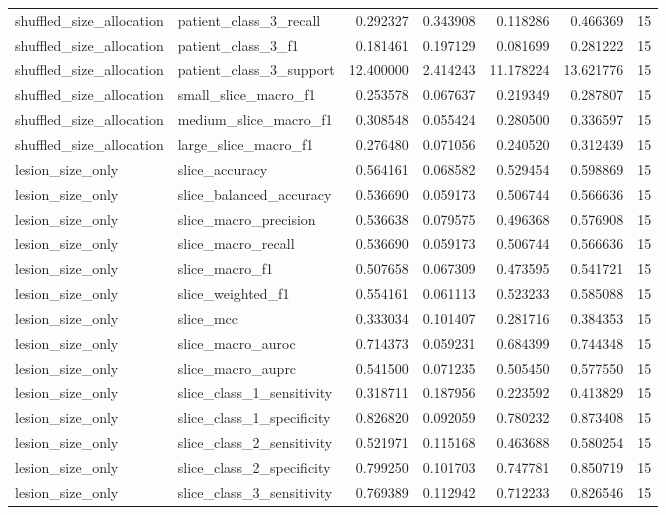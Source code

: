 \begin{tabular}{llrrrrr}
shuffled_size_allocation & patient_class_3_recall & 0.292327 & 0.343908 & 0.118286 & 0.466369 & 15 \\
shuffled_size_allocation & patient_class_3_f1 & 0.181461 & 0.197129 & 0.081699 & 0.281222 & 15 \\
shuffled_size_allocation & patient_class_3_support & 12.400000 & 2.414243 & 11.178224 & 13.621776 & 15 \\
shuffled_size_allocation & small_slice_macro_f1 & 0.253578 & 0.067637 & 0.219349 & 0.287807 & 15 \\
shuffled_size_allocation & medium_slice_macro_f1 & 0.308548 & 0.055424 & 0.280500 & 0.336597 & 15 \\
shuffled_size_allocation & large_slice_macro_f1 & 0.276480 & 0.071056 & 0.240520 & 0.312439 & 15 \\
lesion_size_only & slice_accuracy & 0.564161 & 0.068582 & 0.529454 & 0.598869 & 15 \\
lesion_size_only & slice_balanced_accuracy & 0.536690 & 0.059173 & 0.506744 & 0.566636 & 15 \\
lesion_size_only & slice_macro_precision & 0.536638 & 0.079575 & 0.496368 & 0.576908 & 15 \\
lesion_size_only & slice_macro_recall & 0.536690 & 0.059173 & 0.506744 & 0.566636 & 15 \\
lesion_size_only & slice_macro_f1 & 0.507658 & 0.067309 & 0.473595 & 0.541721 & 15 \\
lesion_size_only & slice_weighted_f1 & 0.554161 & 0.061113 & 0.523233 & 0.585088 & 15 \\
lesion_size_only & slice_mcc & 0.333034 & 0.101407 & 0.281716 & 0.384353 & 15 \\
lesion_size_only & slice_macro_auroc & 0.714373 & 0.059231 & 0.684399 & 0.744348 & 15 \\
lesion_size_only & slice_macro_auprc & 0.541500 & 0.071235 & 0.505450 & 0.577550 & 15 \\
lesion_size_only & slice_class_1_sensitivity & 0.318711 & 0.187956 & 0.223592 & 0.413829 & 15 \\
lesion_size_only & slice_class_1_specificity & 0.826820 & 0.092059 & 0.780232 & 0.873408 & 15 \\
lesion_size_only & slice_class_2_sensitivity & 0.521971 & 0.115168 & 0.463688 & 0.580254 & 15 \\
lesion_size_only & slice_class_2_specificity & 0.799250 & 0.101703 & 0.747781 & 0.850719 & 15 \\
lesion_size_only & slice_class_3_sensitivity & 0.769389 & 0.112942 & 0.712233 & 0.826546 & 15 \\

\end{tabular}
